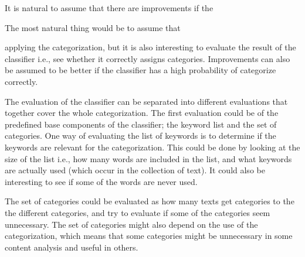 It is natural to assume that there are improvements if the 

The most natural thing would be to assume that 


applying the categorization, but it is also interesting to evaluate the result of the classifier i.e., see whether it correctly assigns categories. Improvements can also be assumed to be better if the classifier has a high probability of categorize correctly.



The evaluation of the classifier can be separated into different evaluations that together cover the whole categorization. 
The first evaluation could be of the predefined base components of the classifier; the keyword list and the set of categories. One way of evaluating the list of keywords is to determine if the keywords are relevant for the categorization. This could be done by looking at the size of the list i.e., how many words are included in the list, and what keywords are actually used (which occur in the collection of text). It could also be interesting to see if some of the words are never used. 

The set of categories could be evaluated as how many texts get categories to the the different categories, and try to evaluate if some of the categories seem unnecessary. The set of categories might also depend on the use of the categorization, which means that some categories might be unnecessary in some content analysis and useful in others. 

